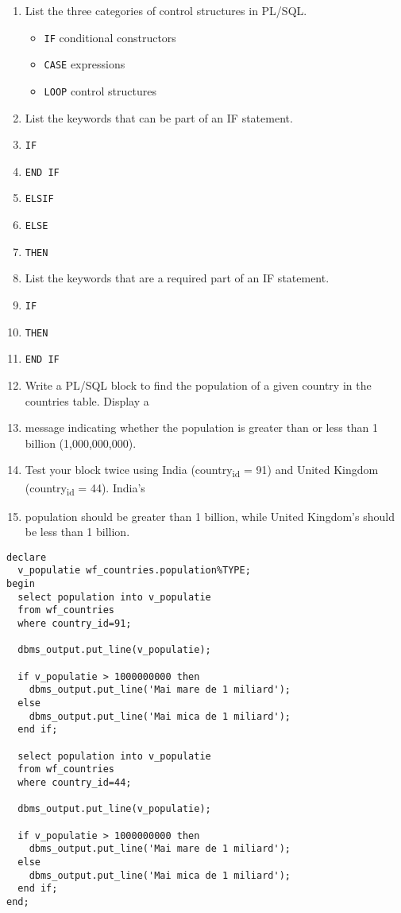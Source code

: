 \documentclass[11pt]{article}
\begin{document}
\begin{enumerate}
\item List the three categories of control structures in PL/SQL.

\begin{itemize}
\item \texttt{IF} conditional constructors
\item \texttt{CASE} expressions
\item \texttt{LOOP} control structures
\end{itemize}

\item List the keywords that can be part of an IF statement.

\item \texttt{IF}
\item \texttt{END IF}
\item \texttt{ELSIF}
\item \texttt{ELSE}
\item \texttt{THEN}

\item List the keywords that are a required part of an IF statement.

\item \texttt{IF}
\item \texttt{THEN}
\item \texttt{END IF}

\item Write a PL/SQL block to find the population of a given country in the countries table. Display a

\item message indicating whether the population is greater than or less than 1 billion (1,000,000,000).
\item Test your block twice using India (country\textsubscript{id} = 91) and United Kingdom (country\textsubscript{id} = 44). India’s
\item population should be greater than 1 billion, while United Kingdom’s should be less than 1 billion.
\end{enumerate}


\begin{verbatim}
declare
  v_populatie wf_countries.population%TYPE;
begin
  select population into v_populatie
  from wf_countries
  where country_id=91;
  
  dbms_output.put_line(v_populatie);
  
  if v_populatie > 1000000000 then
    dbms_output.put_line('Mai mare de 1 miliard');
  else
    dbms_output.put_line('Mai mica de 1 miliard');
  end if;
  
  select population into v_populatie
  from wf_countries
  where country_id=44;
  
  dbms_output.put_line(v_populatie);
  
  if v_populatie > 1000000000 then
    dbms_output.put_line('Mai mare de 1 miliard');
  else
    dbms_output.put_line('Mai mica de 1 miliard');
  end if;
end;

\end{verbatim}
\end{document}
